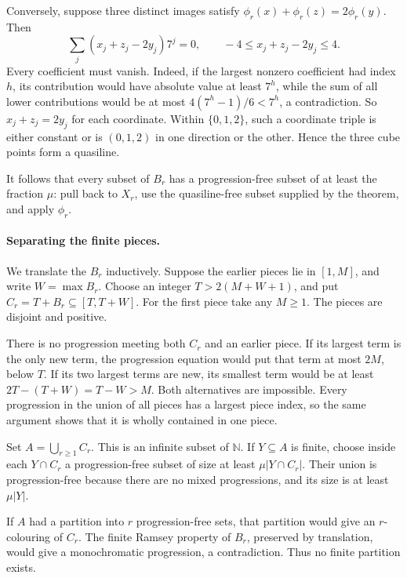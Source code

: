 Conversely, suppose three distinct images satisfy \(\phi_r(x)+\phi_r(z)=2\phi_r(y)\). Then
\[
 \sum_j(x_j+z_j-2y_j)7^j=0,
 \qquad -4\leq x_j+z_j-2y_j\leq4.
\]
Every coefficient must vanish. Indeed, if the largest nonzero coefficient had index \(h\), its contribution would have absolute value at least \(7^h\), while the sum of all lower contributions would be at most
\(4(7^h-1)/6<7^h\), a contradiction. So \(x_j+z_j=2y_j\) for each coordinate. Within \(\{0,1,2\}\), such a coordinate triple is either constant or is \((0,1,2)\) in one direction or the other. Hence the three cube points form a quasiline.

It follows that every subset of \(B_r\) has a progression-free subset of at least the fraction \(\mu\): pull back to \(X_r\), use the quasiline-free subset supplied by the theorem, and apply \(\phi_r\).

\paragraph{Separating the finite pieces.}
We translate the \(B_r\) inductively. Suppose the earlier pieces lie in \([1,M]\), and write \(W=\max B_r\). Choose an integer \(T>2(M+W+1)\), and put
\(C_r=T+B_r\subseteq[T,T+W]\). For the first piece take any \(M\geq1\). The pieces are disjoint and positive.

There is no progression meeting both \(C_r\) and an earlier piece. If its largest term is the only new term, the progression equation would put that term at most \(2M\), below \(T\). If its two largest terms are new, its smallest term would be at least \(2T-(T+W)=T-W>M\). Both alternatives are impossible. Every progression in the union of all pieces has a largest piece index, so the same argument shows that it is wholly contained in one piece.

Set \(A=\bigcup_{r\geq1}C_r\). This is an infinite subset of \(\mathbb N\). If \(Y\subseteq A\) is finite, choose inside each \(Y\cap C_r\) a progression-free subset of size at least \(\mu|Y\cap C_r|\). Their union is progression-free because there are no mixed progressions, and its size is at least \(\mu|Y|\).

If \(A\) had a partition into \(r\) progression-free sets, that partition would give an \(r\)-colouring of \(C_r\). The finite Ramsey property of \(B_r\), preserved by translation, would give a monochromatic progression, a contradiction. Thus no finite partition exists.

